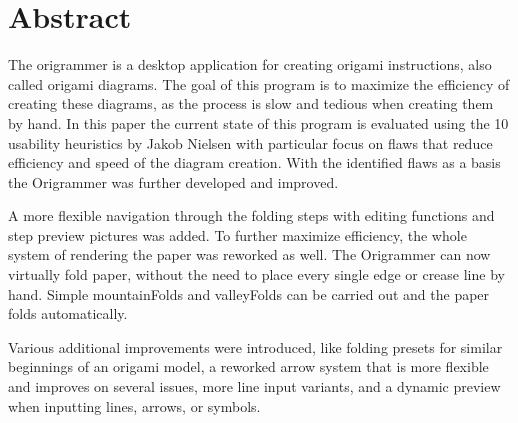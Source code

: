 
\section{Abstract}
\label{sec:abstract}

The \gls{origrammer} is a desktop application for creating origami instructions, also called origami \gls{diagram}s. The goal of this program is to maximize the efficiency of creating these diagrams, as the process is slow and tedious when creating them by hand.
In this paper the current state of this program is evaluated using the 10 usability heuristics by Jakob Nielsen \cite{10usability_heuristics} with particular focus on flaws that reduce efficiency and speed of the diagram creation. With the identified flaws as a basis the Origrammer was further developed and improved.

A more flexible navigation through the folding steps with editing functions and step preview pictures was added. To further maximize efficiency, the whole system of rendering the paper was reworked as well. The Origrammer can now virtually fold paper, without the need to place every single edge or crease line by hand. Simple \gls{mountainFold}s and \gls{valleyFold}s can be carried out and the paper folds automatically.

Various additional improvements were introduced, like folding presets for similar beginnings of an origami model, a reworked arrow system that is more flexible and improves on several issues, more line input variants, and a dynamic preview when inputting lines, arrows, or symbols.